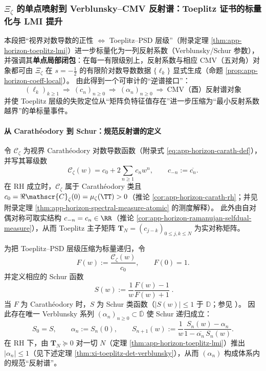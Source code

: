 \subsubsection{\texorpdfstring{$\Xi_\zeta$}{Xi\_zeta} 的单点喷射到 Verblunsky--CMV 反射谱：Toeplitz 证书的标量化与 LMI 提升}\label{subsubsec:xi-verblunsky-cmv-from-local-jet}
本段把“视界对数导数的正性 \(\Leftrightarrow\) Toeplitz--PSD 层级”（附录定理 \ref{thm:app-horizon-toeplitz-lmi}）进一步标量化为一列反射系数（Verblunsky/Schur 参数），并强调其\textbf{单点局部闭包}：在每一有限级别上，反射系数与相应 CMV（五对角）对象都可由 \(\Xi_\zeta\) 在 \(s=-\tfrac12\) 的有限阶对数导数数据 \(\{\ell_k\}\) 显式生成（命题 \ref{prop:app-horizon-coeff-local}）。
由此得到一个可审计的“逆谱接口”：
\[
\boxed{\;
(\ell_k)_{k\ge 1}\ \Longrightarrow\ (c_n)_{n\ge 0}\ \Longrightarrow\ (\alpha_n)_{n\ge 0}
\ \Longrightarrow\ 
\text{CMV（酉）反射谱对象}\;}
\]
并使 Toeplitz 层级的失败定位从“矩阵负特征值存在”进一步压缩为“最小反射系数越界”的单标量事件。

\paragraph{从 Carath\'eodory 到 Schur：规范反射谱的定义}
令 \(\mathscr{C}_{\zeta}\) 为视界 Carath\'eodory 对数导数函数（附录式 \eqref{eq:app-horizon-carath-def}），并写其幂级数
\[
\mathscr{C}_{\zeta}(w)=c_0+2\sum_{n\ge 1}c_n w^n,
\qquad c_{-n}:=\overline{c_n}.
\]
在 RH 成立时，\(\mathscr{C}_\zeta\) 属于 Carath\'eodory 类且 \(c_0=\Re\mathscr{C}_\zeta(0)=\mu_\zeta(\TT)>0\)（推论 \ref{cor:app-horizon-carath-rh}；并见附录定理 \ref{thm:app-horizon-spectral-measure-atomic} 的测度解释）。
此外由自对偶对称可取实结构 \(c_{-n}=c_n\in\RR\)（推论 \ref{cor:app-horizon-ramanujan-selfdual-measure}），从而 Toeplitz 主子矩阵 \(\mathbf{T}_N=(c_{j-k})_{0\le j,k\le N}\) 为实对称矩阵。
\par
为把 Toeplitz--PSD 层级压缩为标量递归，令
\[
F(w):=\frac{\mathscr{C}_{\zeta}(w)}{c_0},
\qquad F(0)=1.
\]
并定义相应的 Schur 函数
\begin{equation}\label{eq:xi-schur-from-carath}
\boxed{\;
S(w):=\frac{1}{w}\frac{F(w)-1}{F(w)+1}\; }.
\end{equation}
当 \(F\) 为 Carath\'eodory 时，\(S\) 为 Schur 类函数（\(|S(w)|\le 1\) 于 \(\mathbb{D}\)；参见 \cite{Simon2005OPUC1}）。
因此存在唯一 Verblunsky 系列 \((\alpha_n)_{n\ge 0}\subset\overline{\mathbb{D}}\) 使 Schur 递归成立：
\[
S_0=S,\qquad \alpha_n:=S_n(0),\qquad
S_{n+1}(w):=\frac{1}{w}\frac{S_n(w)-\alpha_n}{1-\overline{\alpha_n}\,S_n(w)}.
\]
在 RH 下，由 \(\mathbf{T}_N\succeq 0\) 对一切 \(N\)（定理 \ref{thm:app-horizon-toeplitz-lmi}）推出 \(|\alpha_n|\le 1\)（见下述定理 \ref{thm:xi-toeplitz-det-verblunsky}），从而 \((\alpha_n)\) 构成体系内的规范“反射谱”。

